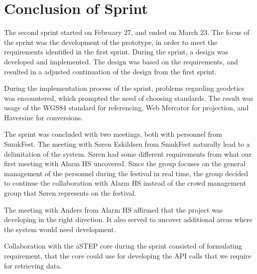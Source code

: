 \section{Conclusion of Sprint}

The second sprint started on February 27, and ended on March 23. The focus of the sprint was the development of the prototype, in order to meet the requirements identified in the first sprint. During the sprint, a design was developed and implemented. The design was based on the requirements, and resulted in a adjusted continuation of the design from the first sprint.

During the implementation process of the sprint, problems regarding geodetics was encountered, which prompted the need of choosing standards. The result was usage of the WGS84 standard for referencing, Web Mercator for projection, and Haversine for conversions.

The sprint was concluded with two meetings, both with personnel from SmukFest. The meeting with Søren Eskildsen from SmukFest naturally lead to a delimitation of the system. Søren had some different requirements from what our first meeting with Alarm HS uncovered. Since the group focuses on the general management of the personnel during the festival in real time, the group decided to continue the collaboration with Alarm HS instead of the crowd management group that Søren represents on the festival.

The meeting with Anders from Alarm HS affirmed that the project was developing in the right direction. It also served to uncover additional areas where the system would need development.

Collaboration with the aSTEP core during the sprint consisted of formulating requirement, that the core could use for developing the API calls that we require for retrieving data.